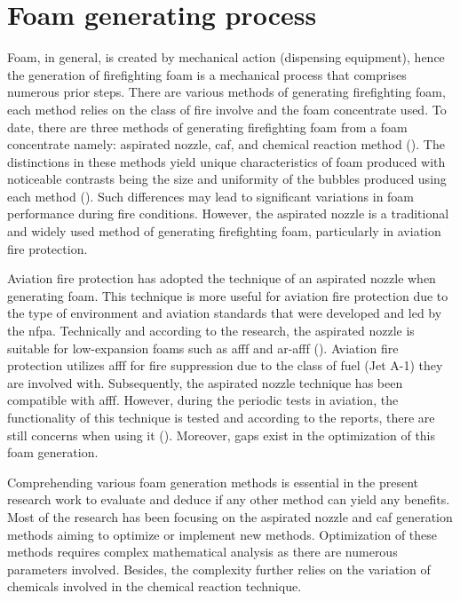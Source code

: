 \section{Foam generating process}
\label{ch2:anchor:foam}
Foam, in general, is created by mechanical action (dispensing equipment), hence the generation of firefighting foam is a mechanical process that comprises numerous prior steps. There are various methods of generating firefighting foam, each method relies on the class of fire involve and the foam concentrate used. To date, there are three methods of generating firefighting foam from a foam concentrate namely: aspirated nozzle, \acrfull{caf}, and chemical reaction method (\cite{laundess2012suppression}). The distinctions in these methods yield unique characteristics of foam produced with noticeable contrasts being the size and uniformity of the bubbles produced using each method (\cite{laundess2012suppression}). Such differences may lead to significant variations in foam performance during fire conditions. However, the aspirated nozzle is a traditional and widely used method of generating firefighting foam, particularly in aviation fire protection. 

Aviation fire protection has adopted the technique of an aspirated nozzle when generating foam. This technique is more useful for aviation fire protection due to the type of environment and aviation standards that were developed and led by the \Acrfull{nfpa}. Technically and according to the research, the aspirated nozzle is suitable for low-expansion foams such as \acrshort{afff} and \acrshort{ar-afff} (\cite{xi2017experimental}).  Aviation fire protection utilizes \acrshort{afff} for fire suppression due to the class of fuel (Jet A-1) they are involved with. Subsequently, the aspirated nozzle technique has been compatible with \acrshort{afff}. However, during the periodic tests in aviation, the functionality of this technique is tested and according to the reports, there are still concerns when using it (\cite{laundess2012suppression}). Moreover, gaps exist in the optimization of this foam generation. 

Comprehending various foam generation methods is essential in the present research work to evaluate and deduce if any other method can yield any benefits. Most of the research has been focusing on the aspirated nozzle and \acrshort{caf} generation methods aiming to optimize or implement new methods. Optimization of these methods requires complex mathematical analysis as there are numerous parameters involved. Besides, the complexity further relies on the variation of chemicals involved in the chemical reaction technique. 

